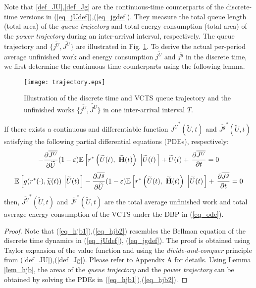 \documentclass[11pt,journal, onecolumn]{./IEEEtran}
\newcommand{\black}{\color{black}}
\newcommand{\red}{\color{black}}
\begin{document}
{\red Note that \eqref{def_JU},\eqref{def_Jg} are the continuous-time counterparts of the discrete-time versions in (\eqref{eq_jUdef}),(\eqref{eq_jgdef}). They measure the total queue length (total area) of the {\em queue trajectory} and total energy consumption (total area) of the {\em power trajectory} during an inter-arrival interval, respectively. The queue trajectory and $\{\overline {{j^U}},\overline {{J^U}}\}$ are illustrated in Fig. \ref{fig_trajectory}. } \black To derive the actual per-period average unfinished work and energy consumption $\overline{j^U}$ and $\overline{j^g}$ in the discrete time, we first determine the continuous time counterparts using the following lemma.


\begin{figure}[t!]
\centering
\texttt{[image: trajectory.eps]}
\caption{{\red Illustration of the discrete time and VCTS queue trajectory and the unfinished works $\{\overline {{j^U}},\widetilde {{J^U}}\}$ in one inter-arrival interval $T$. } \black} \label{fig_trajectory}
\end{figure}


\begin{Lemma}[Verification Lemma of $\overline {{J^U}}$ and $\overline {{J^g}}$ {\red in VCTS}]\label{lem_hjb}
If there exists a continuous and differentiable function $\overline {J^U}^*(\widetilde U,t)$ and $\overline {J^g}^*(\widetilde U,t)$ satisfying the following partial differential equations (PDEs), respectively:
\begin{equation}\label{eq_hjb1}
- \frac{{\partial \overline {{J^U}} }}{{\partial \widetilde U}}(1 - \varepsilon )\mathbb E\left[ {{r^*}\left( {\widetilde U(t),\,\,\widetilde {\bf H}(t)} \right)\,\,\left| {\widetilde U(t)} \right.} \right] + \widetilde U(t) + \,\frac{{\partial \overline {{J^U}} }}{{\partial t}} = 0
\end{equation}
\begin{equation}\label{eq_hjb2}
\mathbb E\left[ {g({r^*}( \cdot ),\widetilde\chi (t))\,\left| {\widetilde U(t)} \right.} \right] - \frac{{\partial \overline {{J^g}} }}{{\partial \widetilde U}}(1 - \varepsilon )\mathbb E\left[ {{r^*}\left( {\widetilde U(t),\,\,\widetilde{\bf{H}}(t)} \right)\,\,\left| {\widetilde U(t)} \right.} \right] + \,\frac{{\partial \overline {{J^g}} }}{{\partial t}} = 0
\end{equation}
then, $\overline {J^U}^*(\widetilde U,t)$ and $\overline {J^g}^*(\widetilde U,t)$ are the total average unfinished work and total average energy consumption of the VCTS under the DBP in (\ref{eq_ode}). ~\hfill\IEEEQED
\end{Lemma}
\begin{proof}
{\red Note that (\ref{eq_hjb1}),(\ref{eq_hjb2}) resembles the Bellman equation of the discrete time dynamics in (\ref{eq_jUdef}), (\ref{eq_jgdef}). The proof is obtained using Taylor expansion of the value function and using the {\em divide-and-conquer} principle from (\ref{def_JU}),(\ref{def_Jg}). Please refer to Appendix A for details. Using Lemma \ref{lem_hjb}, the areas of the {\em queue trajectory} and the {\em power trajectory} can be obtained by solving the PDEs in (\ref{eq_hjb1}),(\ref{eq_hjb2}).}
\end{proof}
\end{document}
